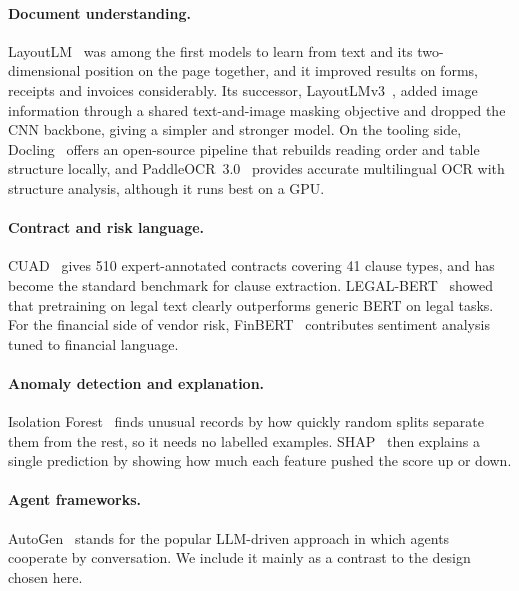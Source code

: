 \paragraph{Document understanding.} LayoutLM~\cite{xu2020layoutlm} was among the first models to learn from text and its two-dimensional position on the page together, and it improved results on forms, receipts and invoices considerably. Its successor, LayoutLMv3~\cite{huang2022layoutlmv3}, added image information through a shared text-and-image masking objective and dropped the CNN backbone, giving a simpler and stronger model. On the tooling side, Docling~\cite{auer2024docling} offers an open-source pipeline that rebuilds reading order and table structure locally, and PaddleOCR~3.0~\cite{cui2025paddleocr} provides accurate multilingual OCR with structure analysis, although it runs best on a GPU.

\paragraph{Contract and risk language.} CUAD~\cite{hendrycks2021cuad} gives 510 expert-annotated contracts covering 41 clause types, and has become the standard benchmark for clause extraction. LEGAL-BERT~\cite{chalkidis2020legalbert} showed that pretraining on legal text clearly outperforms generic BERT on legal tasks. For the financial side of vendor risk, FinBERT~\cite{araci2019finbert} contributes sentiment analysis tuned to financial language.

\paragraph{Anomaly detection and explanation.} Isolation Forest~\cite{liu2008isolation} finds unusual records by how quickly random splits separate them from the rest, so it needs no labelled examples. SHAP~\cite{lundberg2017shap} then explains a single prediction by showing how much each feature pushed the score up or down.

\paragraph{Agent frameworks.} AutoGen~\cite{wu2023autogen} stands for the popular LLM-driven approach in which agents cooperate by conversation. We include it mainly as a contrast to the design chosen here.

